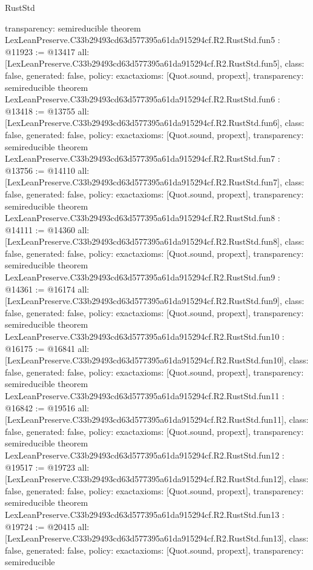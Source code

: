 \begin{lexlean}{RustStd}
\begin{coremodule}
{  transparency: semireducible
}
theorem LexLeanPreserve.C33b29493cd63d577395a61da915294cf.R2.RustStd.fun5 : @11923 := @13417 {
  all: [LexLeanPreserve.C33b29493cd63d577395a61da915294cf.R2.RustStd.fun5],
  class: false,
  generated: false,
  policy: exact{axioms: [Quot.sound, propext]},
  transparency: semireducible
}
theorem LexLeanPreserve.C33b29493cd63d577395a61da915294cf.R2.RustStd.fun6 : @13418 := @13755 {
  all: [LexLeanPreserve.C33b29493cd63d577395a61da915294cf.R2.RustStd.fun6],
  class: false,
  generated: false,
  policy: exact{axioms: [Quot.sound, propext]},
  transparency: semireducible
}
theorem LexLeanPreserve.C33b29493cd63d577395a61da915294cf.R2.RustStd.fun7 : @13756 := @14110 {
  all: [LexLeanPreserve.C33b29493cd63d577395a61da915294cf.R2.RustStd.fun7],
  class: false,
  generated: false,
  policy: exact{axioms: [Quot.sound, propext]},
  transparency: semireducible
}
theorem LexLeanPreserve.C33b29493cd63d577395a61da915294cf.R2.RustStd.fun8 : @14111 := @14360 {
  all: [LexLeanPreserve.C33b29493cd63d577395a61da915294cf.R2.RustStd.fun8],
  class: false,
  generated: false,
  policy: exact{axioms: [Quot.sound, propext]},
  transparency: semireducible
}
theorem LexLeanPreserve.C33b29493cd63d577395a61da915294cf.R2.RustStd.fun9 : @14361 := @16174 {
  all: [LexLeanPreserve.C33b29493cd63d577395a61da915294cf.R2.RustStd.fun9],
  class: false,
  generated: false,
  policy: exact{axioms: [Quot.sound, propext]},
  transparency: semireducible
}
theorem LexLeanPreserve.C33b29493cd63d577395a61da915294cf.R2.RustStd.fun10 : @16175 := @16841 {
  all: [LexLeanPreserve.C33b29493cd63d577395a61da915294cf.R2.RustStd.fun10],
  class: false,
  generated: false,
  policy: exact{axioms: [Quot.sound, propext]},
  transparency: semireducible
}
theorem LexLeanPreserve.C33b29493cd63d577395a61da915294cf.R2.RustStd.fun11 : @16842 := @19516 {
  all: [LexLeanPreserve.C33b29493cd63d577395a61da915294cf.R2.RustStd.fun11],
  class: false,
  generated: false,
  policy: exact{axioms: [Quot.sound, propext]},
  transparency: semireducible
}
theorem LexLeanPreserve.C33b29493cd63d577395a61da915294cf.R2.RustStd.fun12 : @19517 := @19723 {
  all: [LexLeanPreserve.C33b29493cd63d577395a61da915294cf.R2.RustStd.fun12],
  class: false,
  generated: false,
  policy: exact{axioms: [Quot.sound, propext]},
  transparency: semireducible
}
theorem LexLeanPreserve.C33b29493cd63d577395a61da915294cf.R2.RustStd.fun13 : @19724 := @20415 {
  all: [LexLeanPreserve.C33b29493cd63d577395a61da915294cf.R2.RustStd.fun13],
  class: false,
  generated: false,
  policy: exact{axioms: [Quot.sound, propext]},
  transparency: semireducible
}
\end{coremodule}
\end{lexlean}
